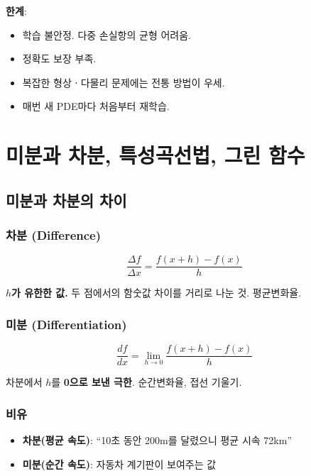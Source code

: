 \documentclass[11pt,a4paper]{article}
\begin{document}
\textbf{한계}:
\begin{itemize}
\item 학습 불안정. 다중 손실항의 균형 어려움.
\item 정확도 보장 부족.
\item 복잡한 형상ㆍ다물리 문제에는 전통 방법이 우세.
\item 매번 새 PDE마다 처음부터 재학습.
\end{itemize}

\section{미분과 차분, 특성곡선법, 그린 함수}

\subsection{미분과 차분의 차이}

\subsubsection{차분 (Difference)}

\begin{equation}
\frac{\Delta f}{\Delta x} = \frac{f(x + h) - f(x)}{h}
\end{equation}

\textbf{$h$가 유한한 값.} 두 점에서의 함숫값 차이를 거리로 나눈 것. 평균변화율.

\subsubsection{미분 (Differentiation)}

\begin{equation}
\frac{df}{dx} = \lim_{h \to 0} \frac{f(x + h) - f(x)}{h}
\end{equation}

차분에서 $h$를 \textbf{0으로 보낸 극한}. 순간변화율, 접선 기울기.

\subsubsection{비유}

\begin{itemize}
\item \textbf{차분(평균 속도)}: ``10초 동안 200m를 달렸으니 평균 시속 72km''
\item \textbf{미분(순간 속도)}: 자동차 계기판이 보여주는 값
\end{itemize}
\end{document}
